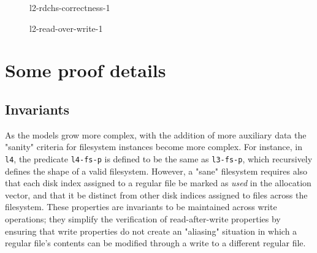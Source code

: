\documentclass[runningheads,a4paper]{llncs}
\begin{document}
\begin{figure}
  \centering
  \caption{l2-rdchs-correctness-1}
  \label{l2-rdchs-correctness-1}
\end{figure}

\begin{figure}
  \centering
  \caption{l2-read-over-write-1}
  \label{l2-read-over-write-1}
\end{figure}

\section{Some proof details}

\subsection{Invariants}

As the models grow more complex, with the addition of more auxiliary
data the "sanity" criteria for filesystem instances become more
complex. For instance, in \texttt{l4}, the predicate \texttt{l4-fs-p}
is defined to be the same as \texttt{l3-fs-p}, which recursively
defines the shape of a valid filesystem. However, a "sane" filesystem
requires also that each disk index assigned to a regular file be
marked as \textit{used} in the allocation vector, and that it be
distinct from other disk indices assigned to files across the
filesystem. These properties are invariants to be maintained across
write operations; they simplify the verification of read-after-write
properties by ensuring that write properties do not create an
"aliasing" situation in which a regular file's contents can be
modified through a write to a different regular file.
\end{document}

